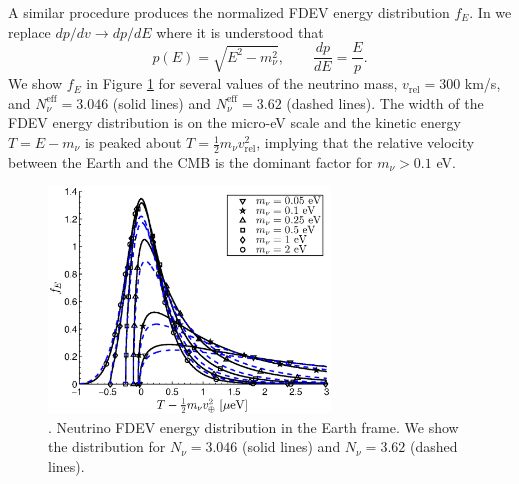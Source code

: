 A similar procedure produces the normalized FDEV energy distribution $f_E$.  In  we replace $dp/dv\to dp/dE$ where it is understood that 
\begin{equation}
p(E)=\sqrt{E^2-m_\nu^2},\qquad \frac{dp}{dE}=\frac{E}{p}.
\end{equation}
We show $f_E$ in Figure \ref{fig:E_dist_300}  for several values of the neutrino mass, $v_{\text{rel}}=300$ km/s, and $N_\nu^{\mathrm{eff}}=3.046$ (solid lines) and $N_\nu^{\mathrm{eff}}=3.62$ (dashed lines). The width of the FDEV energy distribution is on the micro-eV scale and the kinetic energy $T=E-m_\nu$ is peaked about $T=\frac{1}{2}m_\nu v_{\text{rel}}^2$, implying that the relative velocity between the Earth and the CMB is the dominant factor for $m_\nu>0.1$ eV.
\begin{figure}%
\centerline{\includegraphics[height=6cm]{04-birrell/NeutrinoDistributionToday/Figures/E_dist_300.eps}}
\caption{. Neutrino FDEV energy distribution in the Earth frame. We show the distribution for $N_\nu=3.046$ (solid lines) and $N_\nu=3.62$ (dashed lines). }\label{fig:E_dist_300}
 \end{figure}


